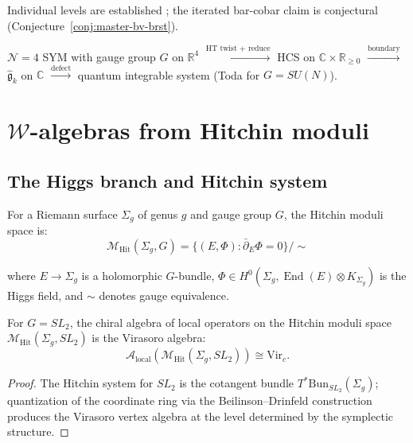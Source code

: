 \begin{remark}[Scope]
Individual levels are established \cite{BD04,CG17,CWY18}; the iterated bar-cobar claim is conjectural (Conjecture~\ref{conj:master-bv-brst}).
\end{remark}

\begin{example}[Explicit tower for \texorpdfstring{$\mathcal{N}=4$}{N=4} SYM]
$\mathcal{N}=4$ SYM with gauge group $G$ on $\mathbb{R}^4$
$\xrightarrow{\text{HT twist + reduce}}$
HCS on $\mathbb{C} \times \mathbb{R}_{\geq 0}$
$\xrightarrow{\text{boundary}}$
$\widehat{\mathfrak{g}}_k$ on $\mathbb{C}$
$\xrightarrow{\text{defect}}$
quantum integrable system (Toda for $G = SU(N)$).
\end{example}

\section{$\mathcal{W}$-algebras from Hitchin moduli}

\subsection{The Higgs branch and Hitchin system}

\begin{definition}
For a Riemann surface $\Sigma_g$ of genus $g$ and gauge group $G$, the Hitchin 
moduli space is:
\[\mathcal{M}_{\text{Hit}}(\Sigma_g, G) = \{(E, \Phi) : \bar{\partial}_E \Phi = 0\} / 
\sim\]

where $E \to \Sigma_g$ is a holomorphic $G$-bundle, $\Phi \in H^0(\Sigma_g, \operatorname{End}(E) \otimes K_{\Sigma_g})$ is the Higgs field, and $\sim$ denotes gauge equivalence.
\end{definition}

\begin{proposition}\label{prop:virasoro-from-hitchin}
For $G = SL_2$, the chiral algebra of local operators on the Hitchin moduli space $\mathcal{M}_{\mathrm{Hit}}(\Sigma_g, SL_2)$ is the Virasoro algebra:
\[\mathcal{A}_{\mathrm{local}}(\mathcal{M}_{\mathrm{Hit}}(\Sigma_g, SL_2)) \cong \mathrm{Vir}_c.\]
\end{proposition}

\begin{proof}
The Hitchin system for $SL_2$ is the cotangent bundle $T^*\mathrm{Bun}_{SL_2}(\Sigma_g)$; quantization of the coordinate ring via the Beilinson--Drinfeld construction \cite{BD04} produces the Virasoro vertex algebra at the level determined by the symplectic structure.
\end{proof}

